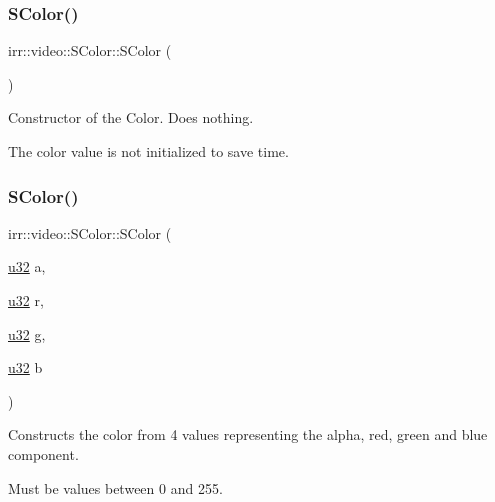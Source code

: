 \subsubsection{\texorpdfstring{S\+Color()}{SColor()}\hspace{0.1cm}{\footnotesize\ttfamily [1/4]}}
{\footnotesize\ttfamily irr\+::video\+::\+S\+Color\+::\+S\+Color (\begin{DoxyParamCaption}{ }\end{DoxyParamCaption})\hspace{0.3cm}{\ttfamily [inline]}}



Constructor of the Color. Does nothing. 

The color value is not initialized to save time. \mbox{\label{classirr_1_1video_1_1SColor_aa2ca1fcb9b11375282bb407b635b3dd6}} 
\subsubsection{\texorpdfstring{S\+Color()}{SColor()}\hspace{0.1cm}{\footnotesize\ttfamily [2/4]}}
{\footnotesize\ttfamily irr\+::video\+::\+S\+Color\+::\+S\+Color (\begin{DoxyParamCaption}\item[{\hyperlink{namespaceirr_a0416a53257075833e7002efd0a18e804}{u32}}]{a,  }\item[{\hyperlink{namespaceirr_a0416a53257075833e7002efd0a18e804}{u32}}]{r,  }\item[{\hyperlink{namespaceirr_a0416a53257075833e7002efd0a18e804}{u32}}]{g,  }\item[{\hyperlink{namespaceirr_a0416a53257075833e7002efd0a18e804}{u32}}]{b }\end{DoxyParamCaption})\hspace{0.3cm}{\ttfamily [inline]}}



Constructs the color from 4 values representing the alpha, red, green and blue component. 

Must be values between 0 and 255. \mbox{\label{classirr_1_1video_1_1SColor_ab001c0c2515ff5f8a0b324d1345485f4}} 
